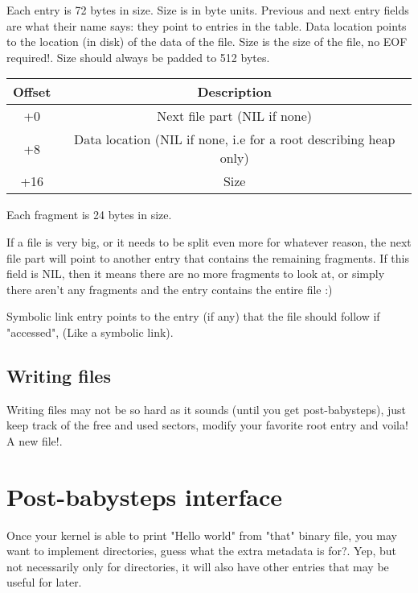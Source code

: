 \documentclass[12pt]{article}
\begin{document}
Each entry is 72 bytes in size. Size is in byte units. Previous and next entry fields are what their name says: they point to entries in the table.
Data location points to the location (in disk) of the data of the file. Size is the size of the file, no EOF required!. Size should always be padded to 512 bytes.

\begin{center}
\begin{tabular}{ |c|c| }
\hline
Offset & Description \\
\hline
+0 & Next file part (NIL if none) \\
+8 & Data location (NIL if none, i.e for a root describing heap only) \\
+16 & Size \\
\hline
\end{tabular}
\end{center}

Each fragment is 24 bytes in size.

If a file is very big, or it needs to be split even more for whatever reason, the next file part will point to another entry that contains the remaining fragments. If this field is NIL, then it means there are no more fragments to look at, or simply there aren't any fragments and the entry contains the entire file :)

Symbolic link entry points to the entry (if any) that the file should follow if "accessed", (Like a symbolic link).

\subsection{Writing files}
Writing files may not be so hard as it sounds (until you get post-babysteps), just keep track of the free and used sectors, modify your favorite root entry and voila! A new file!.

\section{Post-babysteps interface}
Once your kernel is able to print "Hello world" from "that" binary file, you may want to implement directories, guess what the extra metadata is for?. Yep, but not necessarily only for directories, it will also have other entries that may be useful for later.
\end{document}
